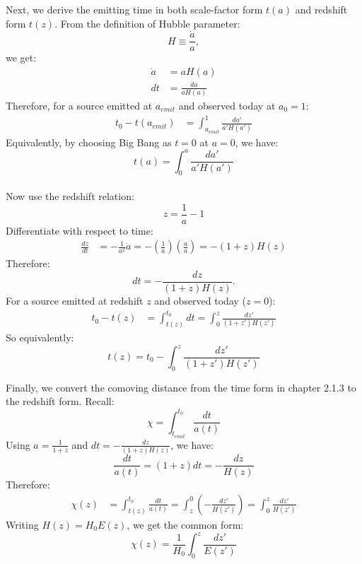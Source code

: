 \bigskip \noindent
\begin{foundation}
    Next, we derive the emitting time in both scale-factor form $t(a)$ and redshift form $t(z)$.
    From the definition of Hubble parameter:
    \[
        H \equiv \frac{\dot{a}}{a},
    \]
    we get:
    \begin{align*}
        \dot{a} &= aH(a) \\
        dt &= \frac{da}{aH(a)}
    \end{align*}
    Therefore, for a source emitted at $a_{emit}$ and observed today at $a_0 = 1$:
    \begin{align*}
        t_0 - t(a_{emit})
        &= \int_{a_{emit}}^{1} \frac{da'}{a'H(a')}
    \end{align*}
    Equivalently, by choosing Big Bang as $t=0$ at $a=0$, we have:
    \[
        t(a) = \int_{0}^{a} \frac{da'}{a'H(a')}
    \] \\

    Now use the redshift relation:
    \[
        z = \frac{1}{a} - 1
    \]
    Differentiate with respect to time:
    \begin{align*}
        \frac{dz}{dt}
        &= -\frac{1}{a^2}\dot{a}
        = -\left(\frac{1}{a}\right)\left(\frac{\dot{a}}{a}\right)
        = -(1+z)H(z)
    \end{align*}
    Therefore:
    \[
        dt = -\frac{dz}{(1+z)H(z)}.
    \]
    For a source emitted at redshift $z$ and observed today ($z=0$):
    \begin{align*}
        t_0 - t(z)
        &= \int_{t(z)}^{t_0} dt
        = \int_0^z \frac{dz'}{(1+z')H(z')}
    \end{align*}
    So equivalently:
    \[
        t(z) = t_0 - \int_0^z \frac{dz'}{(1+z')H(z')}
    \]
\end{foundation}

\bigskip \noindent
\begin{foundation}
    Finally, we convert the comoving distance from the time form in chapter 2.1.3 to the redshift form.
    Recall:
    \[
        \chi = \int_{t_{emit}}^{t_0} \frac{dt}{a(t)}
    \]
    Using $a = \frac{1}{1+z}$ and $dt = -\frac{dz}{(1+z)H(z)}$, we have:
    \[
        \frac{dt}{a(t)} = (1+z)dt = -\frac{dz}{H(z)}
    \]
    Therefore:
    \begin{align*}
        \chi(z)
        &= \int_{t(z)}^{t_0} \frac{dt}{a(t)}
        = \int_z^0 \left(-\frac{dz'}{H(z')}\right)
        = \int_0^z \frac{dz'}{H(z')}
    \end{align*}
    Writing $H(z) = H_0 E(z)$, we get the common form:
    \[
        \chi(z) = \frac{1}{H_0}\int_0^z \frac{dz'}{E(z')}
    \]
\end{foundation}

